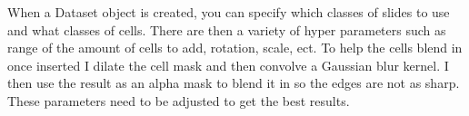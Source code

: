 \documentclass[ms,electronic,oneside,twosidetoc,letterpaper,chaptercenter,parttop]{byumsphd}
\begin{document}
When a Dataset object is created, you can specify which classes of slides to use and what classes of cells.
There are then a variety of hyper parameters such as range of the amount of cells to add, rotation, scale, ect.
To help the cells blend in once inserted I dilate the cell mask and then convolve a Gaussian blur kernel. I then use
the result as an alpha mask to blend it in so the edges are not as sharp. These parameters need to be adjusted to
get the best results.

\begin{figure}[H]
  \centering
   \quad

   \quad


\end{figure}
\end{document}
